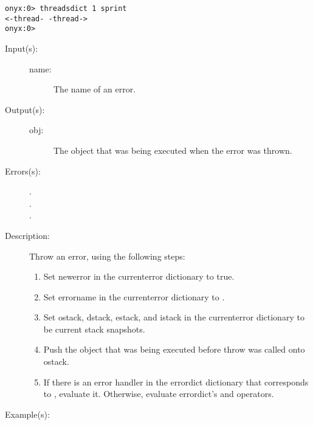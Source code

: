 \begin{description}
\begin{description}
\begin{verbatim}
onyx:0> threadsdict 1 sprint
<-thread- -thread->
onyx:0>
		\end{verbatim}
	\end{description}
\label{systemdict:throw}
\item[{\onyxop{name}{throw}{obj}}: ]
	\begin{description}\item[]
	\item[Input(s): ]
		\begin{description}\item[]
		\item[name: ] The name of an error.
		\end{description}
	\item[Output(s): ]
		\begin{description}\item[]
		\item[obj: ]
			The object that was being executed when the error was
			thrown.
		\end{description}
	\item[Errors(s): ]
		\begin{description}\item[]
		\item[.]
		\item[.]
		\item[.]
		\end{description}
	\item[Description: ]
		Throw an error, using the following steps:
		\begin{enumerate}
		\item{Set newerror in the currenterror dictionary to true.}
		\item{Set errorname in the currenterror dictionary to
		.}
		\item{Set ostack, dstack, estack, and istack in the currenterror
		dictionary to be current stack snapshots.}
		\item{Push the object that was being executed before throw was
		called onto ostack.}
		\item{If there is an error handler in the errordict dictionary
		that corresponds to , evaluate it.  Otherwise,
		evaluate errordict's
		 and
		 operators.}
		\end{enumerate}
	\item[Example(s): ]\begin{verbatim}


\end{verbatim}
\end{description}
\end{description}
